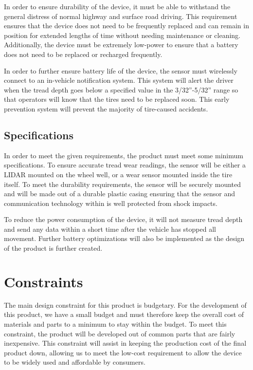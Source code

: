 \documentclass[11pt]{IEEEtran}
\begin{document}
			In order to ensure durability of the device, it must be able to withstand the general distress of normal highway and surface road driving. This requirement ensures that the device does not need to be frequently replaced and can remain in position for extended lengths of time without needing maintenance or cleaning. Additionally, the device must be extremely low-power to ensure that a battery does not need to be replaced or recharged frequently.

			In order to further ensure battery life of the device, the sensor must wirelessly connect to an in-vehicle notification system. This system will alert the driver when the tread depth goes below a specified value in the 3/32''-5/32'' range so that operators will know that the tires need to be replaced soon. This early prevention system will prevent the majority of tire-caused accidents. 

		\subsection{Specifications}
			In order to meet the given requirements, the product must meet some minimum specifications. To ensure accurate tread wear readings, the sensor will be either a LIDAR mounted on the wheel well, or a wear sensor mounted inside the tire itself. To meet the durability requirements, the sensor will be securely mounted and will be made out of a durable plastic casing ensuring that the sensor and communication technology within is well protected from shock impacts.

			To reduce the power consumption of the device, it will not measure tread depth and send any data within a short time after the vehicle has stopped all movement. Further battery optimizations will also be implemented as the design of the product is further created. 

	
	\section{Constraints}
		The main design constraint for this product is budgetary. For the development of this product, we have a small budget and must therefore keep the overall cost of materials and parts to a minimum to stay within the budget. To meet this constraint, the product will be developed out of common parts that are fairly inexpensive. This constraint will assist in keeping the production cost of the final product down, allowing us to meet the low-cost requirement to allow the device to be widely used and affordable by consumers. 
\end{document}
